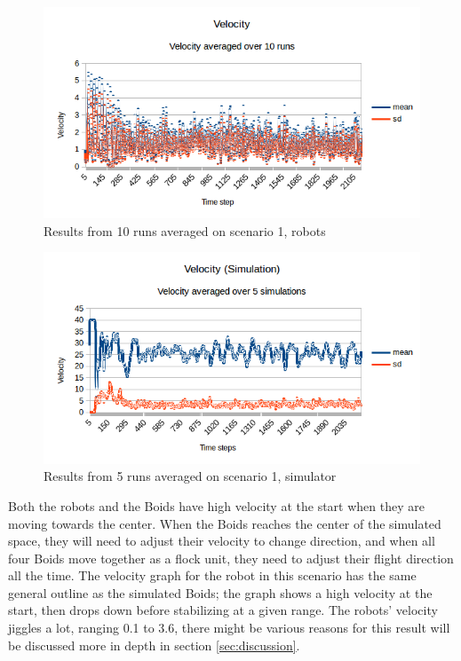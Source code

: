 \begin{figure}[h]
\begin{center}
\includegraphics[width=0.8\linewidth]{figs/runs/1pvel}
\end{center}
\caption[1. Velocity, robots]{Results from 10 runs averaged on scenario 1, robots}
\label{fig:res1pvel}
\end{figure}
\begin{figure}[h]
\begin{center}
\includegraphics[width=0.8\linewidth]{figs/runs/1svel}
\end{center}
\caption[1. Velocity, simulation]{Results from 5 runs averaged on scenario 1, simulator}
\label{fig:res1svel}
\end{figure}
Both the robots and the Boids have high velocity at the start when they are moving towards the center. When the Boids reaches the center of the simulated space, they will need to adjust their velocity to change direction, and when all four Boids move together as a flock unit, they need to adjust their flight direction all the time. 
The velocity graph for the robot in this scenario has the same general outline as the simulated Boids; the graph shows a high velocity at the start, then drops down before stabilizing at a given range. The robots' velocity jiggles a lot, ranging 0.1 to 3.6, there might be various reasons for this result will be discussed more in depth in section \ref{sec:discussion}.
\clearpage
